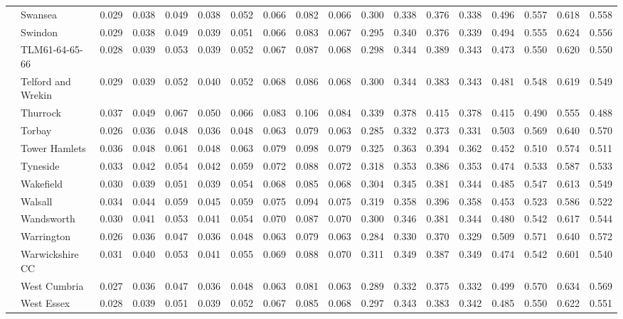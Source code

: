 \begin{tabular}{llrrrrrrrrrrrrrrrr}
 & Swansea & 0.029 & 0.038 & 0.049 & 0.038 & 0.052 & 0.066 & 0.082 & 0.066 & 0.300 & 0.338 & 0.376 & 0.338 & 0.496 & 0.557 & 0.618 & 0.558 \\
 & Swindon & 0.029 & 0.038 & 0.049 & 0.039 & 0.051 & 0.066 & 0.083 & 0.067 & 0.295 & 0.340 & 0.376 & 0.339 & 0.494 & 0.555 & 0.624 & 0.556 \\
 & TLM61-64-65-66 & 0.028 & 0.039 & 0.053 & 0.039 & 0.052 & 0.067 & 0.087 & 0.068 & 0.298 & 0.344 & 0.389 & 0.343 & 0.473 & 0.550 & 0.620 & 0.550 \\
 & Telford and Wrekin & 0.029 & 0.039 & 0.052 & 0.040 & 0.052 & 0.068 & 0.086 & 0.068 & 0.300 & 0.344 & 0.383 & 0.343 & 0.481 & 0.548 & 0.619 & 0.549 \\
 & Thurrock & 0.037 & 0.049 & 0.067 & 0.050 & 0.066 & 0.083 & 0.106 & 0.084 & 0.339 & 0.378 & 0.415 & 0.378 & 0.415 & 0.490 & 0.555 & 0.488 \\
 & Torbay & 0.026 & 0.036 & 0.048 & 0.036 & 0.048 & 0.063 & 0.079 & 0.063 & 0.285 & 0.332 & 0.373 & 0.331 & 0.503 & 0.569 & 0.640 & 0.570 \\
 & Tower Hamlets & 0.036 & 0.048 & 0.061 & 0.048 & 0.063 & 0.079 & 0.098 & 0.079 & 0.325 & 0.363 & 0.394 & 0.362 & 0.452 & 0.510 & 0.574 & 0.511 \\
 & Tyneside & 0.033 & 0.042 & 0.054 & 0.042 & 0.059 & 0.072 & 0.088 & 0.072 & 0.318 & 0.353 & 0.386 & 0.353 & 0.474 & 0.533 & 0.587 & 0.533 \\
 & Wakefield & 0.030 & 0.039 & 0.051 & 0.039 & 0.054 & 0.068 & 0.085 & 0.068 & 0.304 & 0.345 & 0.381 & 0.344 & 0.485 & 0.547 & 0.613 & 0.549 \\
 & Walsall & 0.034 & 0.044 & 0.059 & 0.045 & 0.059 & 0.075 & 0.094 & 0.075 & 0.319 & 0.358 & 0.396 & 0.358 & 0.453 & 0.523 & 0.586 & 0.522 \\
 & Wandsworth & 0.030 & 0.041 & 0.053 & 0.041 & 0.054 & 0.070 & 0.087 & 0.070 & 0.300 & 0.346 & 0.381 & 0.344 & 0.480 & 0.542 & 0.617 & 0.544 \\
 & Warrington & 0.026 & 0.036 & 0.047 & 0.036 & 0.048 & 0.063 & 0.079 & 0.063 & 0.284 & 0.330 & 0.370 & 0.329 & 0.509 & 0.571 & 0.640 & 0.572 \\
 & Warwickshire CC & 0.031 & 0.040 & 0.053 & 0.041 & 0.055 & 0.069 & 0.088 & 0.070 & 0.311 & 0.349 & 0.387 & 0.349 & 0.474 & 0.542 & 0.601 & 0.540 \\
 & West Cumbria & 0.027 & 0.036 & 0.047 & 0.036 & 0.048 & 0.063 & 0.081 & 0.063 & 0.289 & 0.332 & 0.375 & 0.332 & 0.499 & 0.570 & 0.634 & 0.569 \\
 & West Essex & 0.028 & 0.039 & 0.051 & 0.039 & 0.052 & 0.067 & 0.085 & 0.068 & 0.297 & 0.343 & 0.383 & 0.342 & 0.485 & 0.550 & 0.622 & 0.551 \\

\end{tabular}
